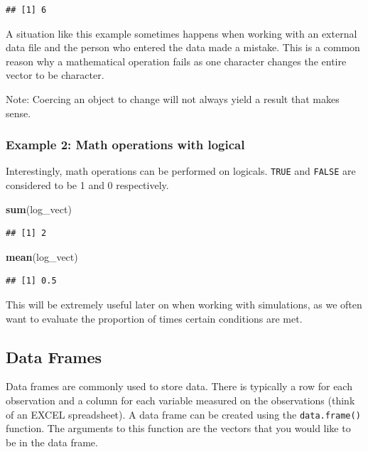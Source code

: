 \documentclass[
]{book}
\newenvironment{Shaded}{\begin{snugshade}}{\end{snugshade}}
\newcommand{\FunctionTok}[1]{\textcolor[rgb]{0.13,0.29,0.53}{\textbf{#1}}}
\newcommand{\NormalTok}[1]{#1}
\theoremstyle{definition}
\theoremstyle{definition}
\theoremstyle{definition}
\theoremstyle{definition}
\theoremstyle{remark}
\begin{document}
\begin{verbatim}
## [1] 6
\end{verbatim}

A situation like this example sometimes happens when working with an external data file and the person who entered the data made a mistake. This is a common reason why a mathematical operation fails as one character changes the entire vector to be character.

Note: Coercing an object to change will not always yield a result that makes sense.

\hypertarget{example-2-math-operations-with-logical}{%
\subsubsection{Example 2: Math operations with logical}\label{example-2-math-operations-with-logical}}

Interestingly, math operations can be performed on logicals. \texttt{TRUE} and \texttt{FALSE} are considered to be 1 and 0 respectively.

\begin{Shaded}
\begin{Highlighting}[]
\FunctionTok{sum}\NormalTok{(log\_vect)}
\end{Highlighting}
\end{Shaded}

\begin{verbatim}
## [1] 2
\end{verbatim}

\begin{Shaded}
\begin{Highlighting}[]
\FunctionTok{mean}\NormalTok{(log\_vect)}
\end{Highlighting}
\end{Shaded}

\begin{verbatim}
## [1] 0.5
\end{verbatim}

This will be extremely useful later on when working with simulations, as we often want to evaluate the proportion of times certain conditions are met.

\hypertarget{data-frames}{%
\subsection{Data Frames}\label{data-frames}}

Data frames are commonly used to store data. There is typically a row for each observation and a column for each variable measured on the observations (think of an EXCEL spreadsheet). A data frame can be created using the \texttt{data.frame()} function. The arguments to this function are the vectors that you would like to be in the data frame.
\end{document}

